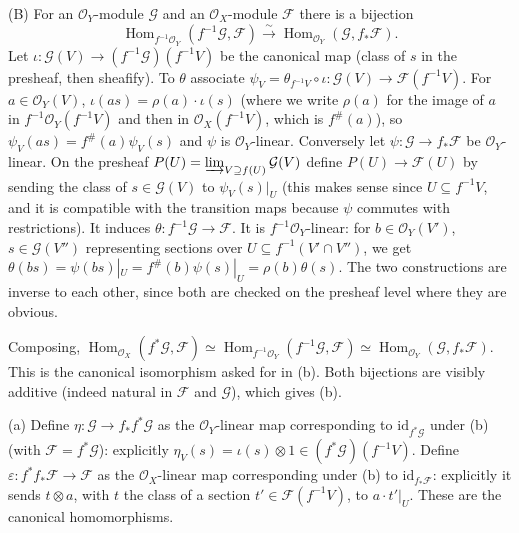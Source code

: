 \documentclass[11pt]{article}
\begin{document}
(B) For an $\mathcal{O}_Y$-module $\mathcal{G}$ and an $\mathcal{O}_X$-module $\mathcal{F}$ there is a bijection
\[ \operatorname{Hom}_{f^{-1}\mathcal{O}_Y}(f^{-1}\mathcal{G},\mathcal{F})\xrightarrow{\ \sim\ }\operatorname{Hom}_{\mathcal{O}_Y}(\mathcal{G},f_*\mathcal{F}). \]
Let $\iota:\mathcal{G}(V)\to(f^{-1}\mathcal{G})(f^{-1}V)$ be the canonical map (class of $s$ in the presheaf, then sheafify). To $\theta$ associate $\psi_V=\theta_{f^{-1}V}\circ\iota:\mathcal{G}(V)\to\mathcal{F}(f^{-1}V)$. For $a\in\mathcal{O}_Y(V)$, $\iota(as)=\rho(a)\cdot\iota(s)$ (where we write $\rho(a)$ for the image of $a$ in $f^{-1}\mathcal{O}_Y(f^{-1}V)$ and then in $\mathcal{O}_X(f^{-1}V)$, which is $f^\#(a)$), so $\psi_V(as)=f^\#(a)\psi_V(s)$ and $\psi$ is $\mathcal{O}_Y$-linear. Conversely let $\psi:\mathcal{G}\to f_*\mathcal{F}$ be $\mathcal{O}_Y$-linear. On the presheaf $P(U)=\varinjlim_{V\supseteq f(U)}\mathcal{G}(V)$ define $P(U)\to\mathcal{F}(U)$ by sending the class of $s\in\mathcal{G}(V)$ to $\psi_V(s)|_U$ (this makes sense since $U\subseteq f^{-1}V$, and it is compatible with the transition maps because $\psi$ commutes with restrictions). It induces $\theta:f^{-1}\mathcal{G}\to\mathcal{F}$. It is $f^{-1}\mathcal{O}_Y$-linear: for $b\in\mathcal{O}_Y(V')$, $s\in\mathcal{G}(V'')$ representing sections over $U\subseteq f^{-1}(V'\cap V'')$, we get $\theta(bs)=\psi(bs)|_U=f^\#(b)\psi(s)|_U=\rho(b)\theta(s)$. The two constructions are inverse to each other, since both are checked on the presheaf level where they are obvious.

Composing, $\operatorname{Hom}_{\mathcal{O}_X}(f^*\mathcal{G},\mathcal{F})\simeq\operatorname{Hom}_{f^{-1}\mathcal{O}_Y}(f^{-1}\mathcal{G},\mathcal{F})\simeq\operatorname{Hom}_{\mathcal{O}_Y}(\mathcal{G},f_*\mathcal{F})$. This is the canonical isomorphism asked for in (b). Both bijections are visibly additive (indeed natural in $\mathcal{F}$ and $\mathcal{G}$), which gives (b).

(a) Define $\eta:\mathcal{G}\to f_*f^*\mathcal{G}$ as the $\mathcal{O}_Y$-linear map corresponding to $\mathrm{id}_{f^*\mathcal{G}}$ under (b) (with $\mathcal{F}=f^*\mathcal{G}$): explicitly $\eta_V(s)=\iota(s)\otimes1\in(f^*\mathcal{G})(f^{-1}V)$. Define $\varepsilon:f^*f_*\mathcal{F}\to\mathcal{F}$ as the $\mathcal{O}_X$-linear map corresponding under (b) to $\mathrm{id}_{f_*\mathcal{F}}$: explicitly it sends $t\otimes a$, with $t$ the class of a section $t'\in\mathcal{F}(f^{-1}V)$, to $a\cdot t'|_U$. These are the canonical homomorphisms.
\end{document}
